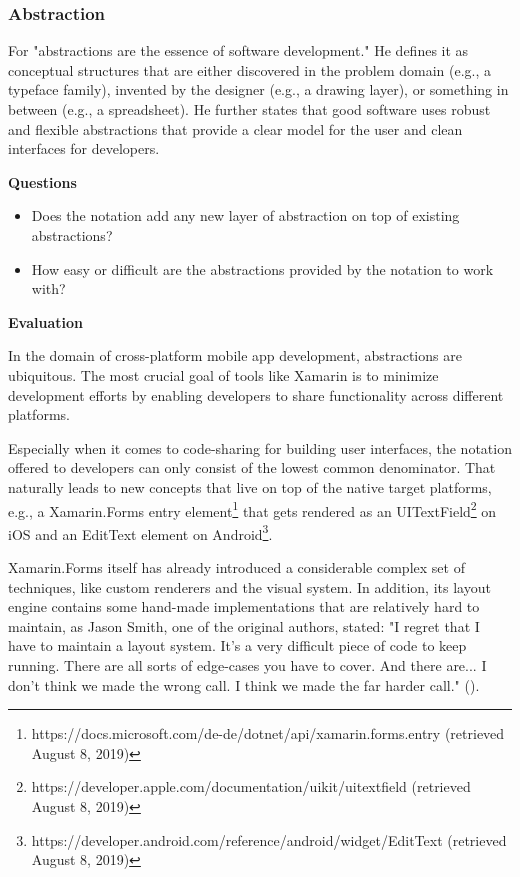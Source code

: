 \subsubsection{Abstraction}

For \cite{jackson_software_2006} "abstractions are the essence of software development." He defines it as conceptual structures that are either discovered in the problem domain (e.g., a typeface family), invented by the designer (e.g., a drawing layer), or something in between (e.g., a spreadsheet). He further states that good software uses robust and flexible abstractions that provide a clear model for the user and clean interfaces for developers.

\textbf{Questions}

\begin{itemize}
\item Does the notation add any new layer of abstraction on top of existing abstractions?
\item How easy or difficult are the abstractions provided by the notation to work with?
\end{itemize}

\textbf{Evaluation}

In the domain of cross-platform mobile app development, abstractions are ubiquitous. The most crucial goal of tools like Xamarin is to minimize development efforts by enabling developers to share functionality across different platforms. 

Especially when it comes to code-sharing for building user interfaces, the notation offered to developers can only consist of the lowest common denominator. That naturally leads to new concepts that live on top of the native target platforms, e.g., a Xamarin.Forms entry element\footnote{https://docs.microsoft.com/de-de/dotnet/api/xamarin.forms.entry (retrieved August 8, 2019)} that gets rendered as an UITextField\footnote{https://developer.apple.com/documentation/uikit/uitextfield (retrieved August 8, 2019)} on iOS and an EditText element on Android\footnote{https://developer.android.com/reference/android/widget/EditText (retrieved August 8, 2019)}.

Xamarin.Forms itself has already introduced a considerable complex set of techniques, like custom renderers and the visual system. In addition, its layout engine contains some hand-made implementations that are relatively hard to maintain, as Jason Smith, one of the original authors, stated: "I regret that I have to maintain a layout system. It's a very difficult piece of code to keep running. There are all sorts of edge-cases you have to cover. And there are... I don't think we made the wrong call. I think we made the far harder call." (\cite{smith_gone_2014}).

